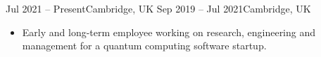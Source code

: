 \documentclass[10pt,a4paper,ragged2e,withhyper]{altacv}
\begin{document}
\begin{paracol}{2}


{Jul 2021 -- Present}{Cambridge, UK}
{Sep 2019 -- Jul 2021}{Cambridge, UK}


% 
% 
% 

% 
% 
% 
% 

% 
% 

% 

% 

\begin{itemize}
    \item Early and long-term employee working on research, engineering and
    management for a quantum computing software startup.


\end{itemize}
\end{paracol}
\end{document}
